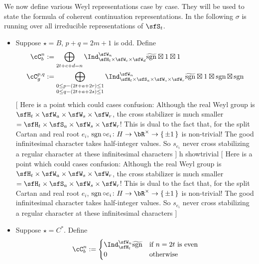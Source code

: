 \documentclass[12pt,a4paper]{amsart}
\newcommand{\trivial}[2][]{\if\relax\detokenize{#1}\relax
  {%
      \color{orange} \vspace{0em} $[$  #2 $]$
      \color{black}
  }
  \else
\ifx#1h
\ifcsname showtrivial\endcsname
{%
    \color{orange} \vspace{0em}  $[$ #2 $]$
    \color{black}
}
\fi
\else {\red Wrong argument!} \fi
\fi
}
\newcommand{\Res}{\mathrm{Res}}
\newcommand{\sgn}{\operatorname{sgn}}
\numberwithin{equation}{section}
\theoremstyle{remark}
\def\hsgn{\widetilde{\mathrm{sgn}}}
\def\brsgn{\breve{\sgn}}
\begin{document}
We now define various Weyl representations case by case.
They will be used to state the formula of coherent continuation representations.
In the following $\sigma$ is running over all irreducible representations of
$\sfS_{t}$.
\begin{itemize}
  \item Suppose $\star= B$, $p+q=2m+1$ is odd. Define
        \[
        \begin{split}
          \cC_b^{n} & :=\bigoplus_{\substack{2t+c+d=n}} \Ind_{\sfH_{t} \times \sfW_{c}\times \sfW_{d}}^{\sfW_{n}}
          \hsgn\boxtimes 1\boxtimes 1 \\
          \cC_g^{p,q} &:=\bigoplus_{\substack{0\leq p-(2t+a+2r)\leq 1\\0\leq q - (2t+a+2s)\leq 1}} \Ind_{\sfH_{t} \times \sfS_{a}\times \sfW_s\times \sfW_r}^{\sfW_{n}}
          \hsgn \boxtimes 1 \boxtimes \sgn \boxtimes \sgn \\
        \end{split}
        \]
        \trivial[]{ Here is a point which could cases confusion: Although the
        real Weyl group is
        $\sfH_{t}\times \sfW_{a}\times \sfW_{s}\times \sfW_{r}$, the cross
        stabilizer is much smaller
        $=\sfH_{t}\times \sfS_{a}\times \sfW_{s}\times \sfW_{r}$! This is dual
        to the fact that, for the split Cartan and real root $e_{i}$,
        $\sgn\circ e_{i}\colon H\rightarrow \bR^{\times}\rightarrow \set{\pm 1}$
        is non-trivial! The good infinitesimal character takes half-integer
        values. So $s_{e_{i}}$ never cross stabilizing a regular character at
        these infinitesimal characters }
  \item Suppose $\star=C^{*}$. Define
        \[
        \begin{split}
          \cC_b^{n} & :=
          \begin{cases}
           \Ind_{\sfH_{t}}^{\sfW_{n}} \hsgn &
            \text{if $n=2t$ is even} \\
            0 & \text{otherwise}\\
          \end{cases}\\

\end{split}\]
\end{itemize}
\end{document}
